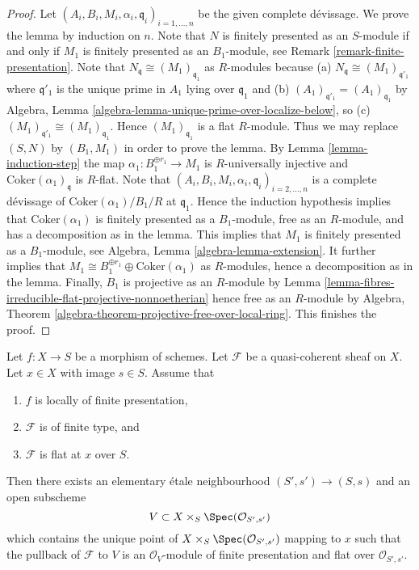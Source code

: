 \begin{proof}
Let $(A_i, B_i, M_i, \alpha_i, \mathfrak q_i)_{i = 1, \ldots, n}$
be the given complete d\'evissage. We prove the lemma by induction on $n$.
Note that $N$ is finitely presented as an $S$-module if and only if
$M_1$ is finitely presented as an $B_1$-module, see
Remark \ref{remark-finite-presentation}.
Note that $N_{\mathfrak q} \cong (M_1)_{\mathfrak q_1}$ as $R$-modules
because (a) $N_{\mathfrak q} \cong (M_1)_{\mathfrak q'_1}$ where
$\mathfrak q'_1$ is the unique prime in $A_1$ lying over $\mathfrak q_1$
and (b) $(A_1)_{\mathfrak q'_1} = (A_1)_{\mathfrak q_1}$ by
Algebra, Lemma \ref{algebra-lemma-unique-prime-over-localize-below},
so (c) $(M_1)_{\mathfrak q'_1} \cong (M_1)_{\mathfrak q_1}$.
Hence $(M_1)_{\mathfrak q_1}$ is a flat $R$-module. Thus we may replace
$(S, N)$ by $(B_1, M_1)$ in order to prove the lemma. By
Lemma \ref{lemma-induction-step}
the map $\alpha_1 : B_1^{\oplus r_1} \to M_1$ is $R$-universally injective
and $\text{Coker}(\alpha_1)_{\mathfrak q}$ is $R$-flat.
Note that $(A_i, B_i, M_i, \alpha_i, \mathfrak q_i)_{i = 2, \ldots, n}$
is a complete d\'evissage of $\text{Coker}(\alpha_1)/B_1/R$ at
$\mathfrak q_1$. Hence the induction hypothesis
implies that $\text{Coker}(\alpha_1)$ is finitely presented as a
$B_1$-module, free as an $R$-module, and has a decomposition as in the lemma.
This implies that $M_1$ is finitely presented as a $B_1$-module, see
Algebra, Lemma \ref{algebra-lemma-extension}.
It further implies that
$M_1 \cong B_1^{\oplus r_1} \oplus \text{Coker}(\alpha_1)$
as $R$-modules, hence a decomposition as in the lemma.
Finally, $B_1$ is projective as an $R$-module by
Lemma \ref{lemma-fibres-irreducible-flat-projective-nonnoetherian}
hence free as an $R$-module by
Algebra, Theorem \ref{algebra-theorem-projective-free-over-local-ring}.
This finishes the proof.
\end{proof}

\begin{proposition}
\label{proposition-finite-type-flat-at-point}
Let $f : X \to S$ be a morphism of schemes.
Let $\mathcal{F}$ be a quasi-coherent sheaf on $X$.
Let $x \in X$ with image $s \in S$.
Assume that
\begin{enumerate}
\item $f$ is locally of finite presentation,
\item $\mathcal{F}$ is of finite type, and
\item $\mathcal{F}$ is flat at $x$ over $S$.
\end{enumerate}
Then there exists an elementary \'etale neighbourhood $(S', s') \to (S, s)$
and an open subscheme
$$
V \subset X \times_S \Spec(\mathcal{O}_{S', s'})
$$
which contains the unique point of
$X \times_S \Spec(\mathcal{O}_{S', s'})$ mapping to $x$
such that the pullback of $\mathcal{F}$ to $V$ is an $\mathcal{O}_V$-module
of finite presentation and flat over $\mathcal{O}_{S', s'}$.
\end{proposition}

